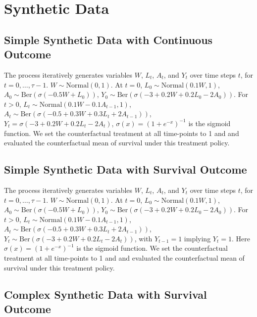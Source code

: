 \documentclass{article}
\theoremstyle{plain}
\theoremstyle{definition}
\theoremstyle{remark}
\begin{document}
\section{Synthetic Data}

\subsection{Simple Synthetic Data with Continuous Outcome}
\label{sec:continuous synthetic data}

The process iteratively generates variables $W$, $L_t$, $A_t$, and $Y_t$ over time steps $t$, for $t = 0 ,\ldots, \tau-1$. $W\sim \text{Normal}(0,1)$. At $t=0$, $L_0 \sim \text{Normal}(0.1W, 1)$, $A_0 \sim \text{Ber}( \sigma(-0.5W + L_0))$, $Y_0 \sim \text{Ber}(\sigma(-3 + 0.2W + 0.2L_0 - 2 A_0))$. For $t > 0$, $L_t \sim \text{Normal}(0.1W - 0.1A_{t-1}, 1)$, $A_t \sim \text{Ber}(\sigma(-0.5 + 0.3 W + 0.3 L_t + 2 A_{t-1}))$, $Y_t = \sigma(-3 + 0.2 W + 0.2 L_t - 2 A_t)$, $\sigma(x)=(1+e^{-x})^{-1}$ is the sigmoid function. We set the counterfactual treatment at all time-points to 1 and and evaluated the counterfactual mean of survival under this treatment policy.

\subsection{Simple Synthetic Data with Survival Outcome}
\label{sec:simple synthetic data}

The process iteratively generates variables $W$, $L_t$, $A_t$, and $Y_t$ over time steps $t$, for $t = 0 ,\ldots, \tau-1$. $W\sim \text{Normal}(0,1)$. At $t=0$, $L_0 \sim \text{Normal}(0.1W, 1)$, $A_0 \sim \text{Ber}( \sigma(-0.5W + L_0))$, $Y_0 \sim \text{Ber}(\sigma(-3 + 0.2W + 0.2L_0 - 2 A_0))$. For $t > 0$, $L_t \sim \text{Normal}(0.1W - 0.1A_{t-1}, 1)$, $A_t \sim \text{Ber}(\sigma(-0.5 + 0.3 W + 0.3 L_t + 2 A_{t-1}))$, $Y_t \sim \text{Ber}(\sigma(-3 + 0.2 W + 0.2 L_t - 2 A_t))$, with $Y_{t-1} = 1$ implying $Y_t = 1$. Here $\sigma(x)=(1+e^{-x})^{-1}$ is the sigmoid function. We set the counterfactual treatment at all time-points to 1 and and evaluated the counterfactual mean of survival under this treatment policy.

\subsection{Complex Synthetic Data with Survival Outcome}
\label{sec:complex synthetic data}
\end{document}
